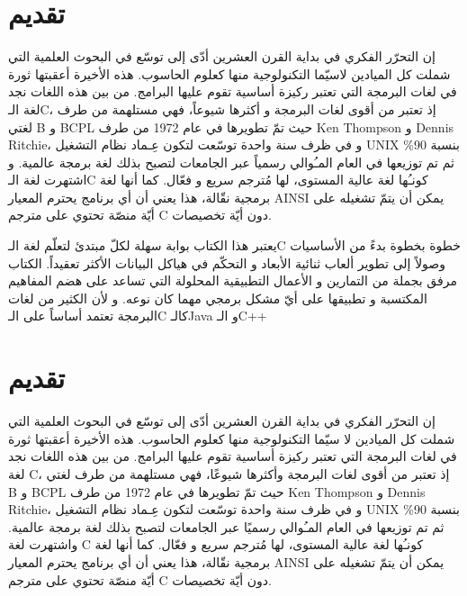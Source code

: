 \chapter*{تقديم}
إن التحرّر الفكري في بداية القرن العشرين أدّى إلى توسّع في البحوث العلمية التي شملت كل الميادين لاسيّما التكنولوجية منها كعلوم الحاسوب. هذه الأخيرة أعقبتها ثورة في لغات البرمجة التي تعتبر ركيزة أساسية تقوم عليها البرامج. من بين هذه اللغات نجد لغة الـ\textenglish{C}،
إذ تعتبر من أقوى لغات البرمجة و أكثرها شيوعاً، فهي مستلهمة من طرف لغتي
 \textenglish{B}
 و
 \textenglish{BCPL}
حيث تمّ تطويرها في عام 1972 من طرف
\textenglish{Ken Thompson}
و
 \textenglish{Dennis Ritchie}،
و في ظرف سنة واحدة توسّعت لتكون عِـماد نظام التشغيل
\textenglish{UNIX}
بنسبة
90\%
ثم تم توزيعها في العام المـُوالي رسمياً عبر الجامعات لتصبح بذلك لغة برمجة عالمية. و اشتهرت لغة الـ\textenglish{C}
 كونـُها لغة عالية المستوى، لها مُترجم سريع و فعّال. كما أنها لغة برمجية نقّالة، هذا يعني أن أي برنامج يحترم المعيار
\textenglish{AINSI}
يمكن أن يتمّ تشغيله على أيّة منصّة تحتوي على مترجم
\textenglish{C}
 دون أيّة تخصيصات.

يعتبر هذا الكتاب بوابة سهلة لكلّ مبتدئ لتعلّم لغة الـ\textenglish{C}
خطوة بخطوة بدءً من الأساسيات وصولاً إلى تطوير ألعاب ثنائية الأبعاد و التحكّم في هياكل البيانات الأكثر تعقيداً. الكتاب مرفق بجملة من التمارين و الأعمال التطبيقية المحلولة التي تساعد على هضم المفاهيم المكتسبة و تطبيقها على أيّ مشكل برمجي مهما كان نوعه. و لأن الكثير من لغات البرمجة تعتمد أساساً على الـ\textenglish{C}
كالـ\textenglish{Java}
و الـ\textenglish{C++}\chapter*{تقديم}
إن التحرّر الفكري في بداية القرن العشرين أدّى إلى توسّع في البحوث العلمية التي شملت كل الميادين لا سيّما التكنولوجية منها كعلوم الحاسوب. هذه الأخيرة أعقبتها ثورة في لغات البرمجة التي تعتبر ركيزة أساسية تقوم عليها البرامج. من بين هذه اللغات نجد لغة \textenglish{C}،
إذ تعتبر من أقوى لغات البرمجة وأكثرها شيوعًا، فهي مستلهمة من طرف لغتي
 \textenglish{B}
 و
 \textenglish{BCPL}
حيث تمّ تطويرها في عام 1972 من طرف
\textenglish{Ken Thompson}
و
 \textenglish{Dennis Ritchie}،
و في ظرف سنة واحدة توسّعت لتكون عِـماد نظام التشغيل
\textenglish{UNIX}
بنسبة
90\%
ثم تم توزيعها في العام المـُوالي رسميًا عبر الجامعات لتصبح بذلك لغة برمجة عالمية. واشتهرت لغة \textenglish{C}
 كونـُها لغة عالية المستوى، لها مُترجم سريع و فعّال. كما أنها لغة برمجية نقّالة، هذا يعني أن أي برنامج يحترم المعيار
\textenglish{AINSI}
يمكن أن يتمّ تشغيله على أيّة منصّة تحتوي على مترجم
\textenglish{C}
 دون أيّة تخصيصات.

